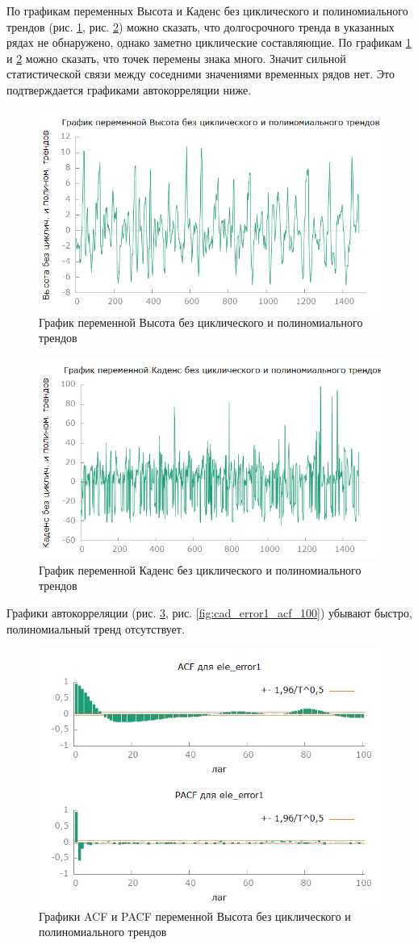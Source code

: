 \documentclass[a4paper,12pt]{article}
\begin{document}
По графикам переменных Высота и Каденс без циклического и полиномиального трендов (рис. \ref{fig:ele_error1}, рис. \ref{fig:cad_error1}) можно сказать, что долгосрочного тренда в указанных рядах не обнаружено, однако заметно циклические составляющие. По графикам \ref{fig:ele_error1} и \ref{fig:cad_error1} можно сказать, что точек перемены знака много. Значит сильной статистической связи между соседними значениями временных рядов нет. Это подтверждается графиками автокорреляции ниже.

\begin{figure}[H]
	\centering
	\includegraphics[width=0.5\linewidth]{../[graphics]/ele_error1.png}
	\caption{График переменной Высота без циклического и полиномиального трендов}
	\label{fig:ele_error1}
\end{figure}

\begin{figure}[H]
	\centering
	\includegraphics[width=0.5\linewidth]{../[graphics]/cad_error1.png}
	\caption{График переменной Каденс без циклического и полиномиального трендов}
	\label{fig:cad_error1}
\end{figure}

Графики автокорреляции (рис. \ref{fig:ele_error1_acf_100}, рис. \ref{fig:cad_error1_acf_100}) убывают быстро, полиномиальный тренд отсутствует.

\begin{figure}[H]
	\centering
	\includegraphics[width=0.5\linewidth]{../[graphics]/ele_error1_acf_100.png}
	\caption{Графики ACF и PACF переменной Высота без циклического и полиномиального трендов}
	\label{fig:ele_error1_acf_100}
\end{figure}
\end{document}
